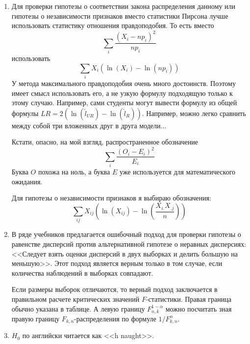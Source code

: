\documentclass[pdftex,12pt,a4paper]{article}
\begin{document}
\begin{enumerate}
\item Для проверки гипотезы о соответствии закона распределения данному или гипотезы о независимости признаков вместо статистики Пирсона лучше использовать статистику отношения правдоподобия.
То есть вместо 
\[ \sum_i \frac{(X_i-np_i)^2}{np_i} \]
использовать
\[ \sum_i X_i(\ln(X_i)-\ln(np_i)) \]
У метода максимального правдоподобия очень много достоинств. Поэтому имеет смысл использовать его, а не узкую формулу подходящую только к этому случаю. Например, сами студенты могут вывести формулу из общей формулы $LR=2(\ln(\hat{l}_{UR})-\ln(\hat{l}_{R}))$. Например, можно легко сравнить между собой три вложенных друг в друга модели...


Кстати, опасно, на мой взгляд, распространенное обозначение 
\[ \sum_i \frac{(O_i-E_i)^2}{E_i} \]
Буква $O$ похожа на ноль, а буква $E$ уже используется для математического ожидания. 


Для гипотезы о независимости признаков я выбираю обозначения:
\[ \sum_{ij} X_{ij}\left(\ln(X_{ij})-\ln\left(\frac{X_{i.}X_{.j}}{n} \right)\right) \]

\item В ряде учебников предлагается ошибочный подход для проверки гипотезы о равенстве дисперсий против альтернативной гипотезе о неравных дисперсиях: <<Следует взять оценки дисперсий в двух выборках и делить большую на меньшую>>. Этот подход является верным только в том случае, если количества наблюдений в выборках совпадают. 


Если размеры выборок отличаются, то верный подход заключается в правильном расчете критических значений $F$-статистики. Правая граница обычно указана в таблице. А левую границу $F_{n,k}^{1-\alpha}$ можно посчитать зная правую границу $F_{k,n}$-распределения по формуле $1/F_{k,n}^{\alpha}$.


\item $H_0$ по английски читается как <<h naught>>.


\end{enumerate}




\end{document}
